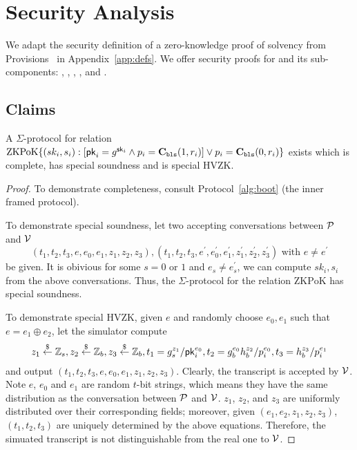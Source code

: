 \chapter{Security Analysis}
\label{sec:proof}

We adapt the security definition of a zero-knowledge proof of solvency from Provisions~\cite{provisions} in Appendix~\ref{app:defs}. We offer security proofs for \Sys and its sub-components: \bootstrap, \userproof, \pol, \poa, and \pos.

\section{Claims}


\begin{theorem}
\label{thm:sigmaclaim}
A $\Sigma$-protocol for relation $\mathrm{ZKPoK}\{(sk_i,s_i):[\mathsf{pk}_i=g^{\mathsf{sk}_i}\land{p_i}=\textbf{C}_\texttt{bls}(1,r_i)] \lor{p_i}=\textbf{C}_\texttt{bls}(0,r_i)\}$ exists which is complete, has special soundness and is special HVZK. 
\end{theorem}

\begin{proof}
To demonstrate completeness, consult Protocol~\ref{alg:boot} (the inner framed protocol).

To demonstrate special soundness, let two accepting conversations between $\mathcal{P}$ and $\mathcal{V}$
$$
(t_1,t_2,t_3,e,e_0,e_1,z_1,z_2,z_3),(t_1,t_2,t_3,e^\prime,e_0^\prime,e_1^\prime,z_1^\prime,z_2^\prime,z_3^\prime)\text{ with $e\ne{e^\prime}$}
$$
be given. It is obivious for some $s=0$ or $1$ and $e_s\ne{e_s^\prime}$, we can compute $sk_i,s_i$ from the above conversations. Thus, the $\Sigma$-protocol for the relation $\mathrm{ZKPoK}$ has special soundness.

To demonstrate special HVZK, given $e$ and randomly choose $e_0,e_1$ such that $e=e_1\oplus{e_2}$, let the simulator compute
$$
z_1\stackrel{\$}{\leftarrow}\mathbb{Z}_s,z_2\stackrel{\$}{\leftarrow}\mathbb{Z}_b,z_3\stackrel{\$}{\leftarrow}\mathbb{Z}_b,t_1=g_s^{z_1}/\mathsf{pk}_i^{e_0},t_2=g_b^{e_0}h_b^{z_2}/{p_i^{e_0}},t_3=h_b^{z_3}/{p_i^{e_1}}
$$
and output $(t_1,t_2,t_3,e,e_0,e_1,z_1,z_2,z_3)$. Clearly, the transcript is accepted by $\mathcal{V}$. Note $e$, $e_0$ and $e_1$ are random $t$-bit strings, which means they have the same distribution as the conversation between $\mathcal{P}$ and $\mathcal{V}$. $z_1$, $z_2$, and $z_3$ are uniformly distributed over their corresponding fields; moreover, given $(e_1,e_2,z_1,z_2,z_3)$, $(t_1,t_2,t_3)$ are uniquely determined by the above equations. Therefore, the simuated transcript is not distinguishable from the real one to $\mathcal{V}$.
\end{proof}

